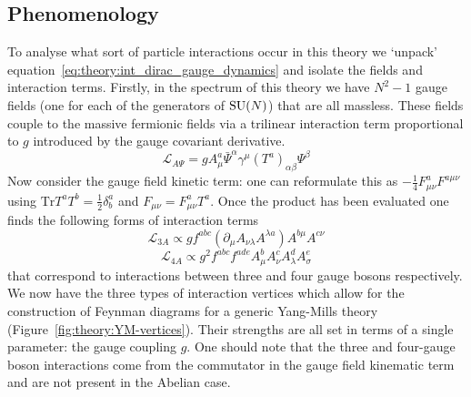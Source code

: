 \subsection{Phenomenology}
To analyse what sort of particle interactions occur in this theory we `unpack' equation~\ref{eq:theory:int_dirac_gauge_dynamics} and isolate the fields and interaction terms. 
Firstly, in the spectrum of this theory we have $N^{2}-1$ gauge fields (one for each of the generators of ${\mathrm{SU}(N)}$) that are all massless. 
These fields couple to the massive fermionic fields via a trilinear interaction term proportional to $g$ introduced by the gauge covariant derivative.
\begin{equation}
    \mathcal{L}_{{A}\Psi} = gA_{\mu}^{a}\bar{\Psi}^{\alpha}\gamma^{\mu}(T^{a})_{\alpha\beta}\Psi^{\beta}
\end{equation}
Now consider the gauge field kinetic term: one can reformulate this as $-\frac{1}{4}F^{a}_{\mu\nu}F^{a\mu\nu}$ using $\mathrm{Tr}T^{a}T^{b} = \frac{1}{2}\delta^{a}_{b}$ and $F_{\mu\nu} = F^{a}_{\mu\nu}T^{a}$. 
Once the product has been evaluated one finds the following forms of interaction terms
\begin{equation}
    \mathcal{L}_{3A} \propto gf^{abc}(\partial_{\mu}A_{\nu\lambda}A^{\lambda{a}})A^{b\mu}A^{c\nu} 
\end{equation}
%
\begin{equation}
    \mathcal{L}_{4A} \propto g^{2}f^{abc}f^{ade}A_{\mu}^{b}A_{\nu}^{c}A_{\lambda}^{d}A_{\sigma}^{e}
\end{equation}
%
that correspond to interactions between three and four gauge bosons respectively. 
We now have the three types of interaction vertices which allow for the construction of Feynman diagrams for a generic Yang-Mills theory (Figure~\ref{fig:theory:YM-vertices}). 
Their strengths are all set in terms of a single parameter: the gauge coupling $g$.
One should note that the three and four-gauge boson interactions come from the commutator in the gauge field kinematic term and are not present in the Abelian case. 

